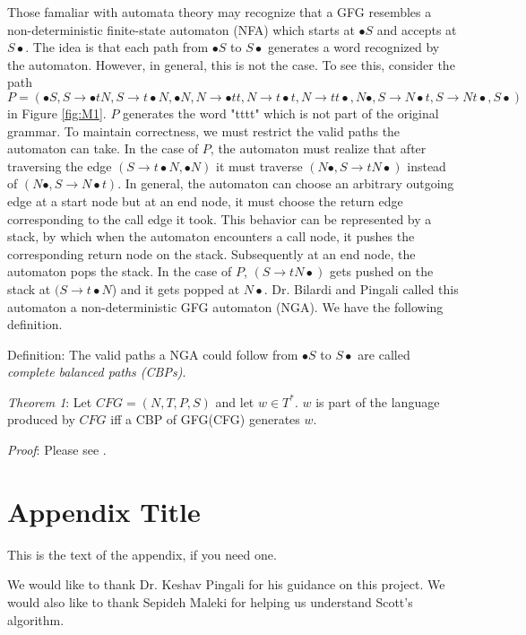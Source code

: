 \documentclass{sigplanconf}
\begin{document}
Those famaliar with automata theory may recognize that a GFG resembles a non-deterministic finite-state automaton (NFA) which starts at $\bullet{S}$ and accepts at $S\bullet$. The idea is that each path from $\bullet{S}$ to $S\bullet$ generates a word recognized by the automaton. However, in general, this is not the case. To see this, consider the path $P = (\bullet{S}, S\longrightarrow{\bullet{tN}}, S\longrightarrow{t\bullet{N}}, \bullet{N}, N\longrightarrow{\bullet{tt}}, N\longrightarrow{t\bullet{t}}, N\longrightarrow{tt\bullet}, N\bullet, S\longrightarrow{N\bullet{t}}, S\longrightarrow{Nt\bullet}, S\bullet)$ in Figure \ref{fig:M1}. $P$ generates the word "tttt" which is not part of the original grammar. To maintain correctness, we must restrict the valid paths the automaton can take. In the case of $P$, the automaton must realize that after traversing the edge $(S\longrightarrow{t\bullet{N}}, \bullet{N})$ it must traverse $(N\bullet, S\longrightarrow{tN\bullet})$ instead of $(N\bullet, S\longrightarrow{N\bullet{t}})$. In general, the automaton can choose an arbitrary outgoing edge at a start node but at an end node, it must choose the return edge corresponding to the call edge it took. This behavior can be represented by a stack, by which when the automaton encounters a call node, it pushes the corresponding return node on the stack. Subsequently at an end node, the automaton pops the stack. In the case of $P$, $(S\longrightarrow{tN\bullet})$ gets pushed on the stack at $(S\longrightarrow{t\bullet{N}}$) and it gets popped at $N\bullet$. Dr. Bilardi and Pingali called this automaton a non-deterministic GFG automaton (NGA). We have the following definition.

Definition: The valid paths a NGA could follow from $\bullet{S}$ to $S\bullet$ are called \textit{complete balanced paths (CBPs)}.

\textit{Theorem 1}: Let $CFG = (N, T, P, S)$ and let $w\in{T^*}$. $w$ is part of the language produced by $CFG$ iff a CBP of GFG(CFG) generates $w$.

\textit{Proof}: Please see \cite{bilardi-pingali}.
\appendix
\section{Appendix Title}

This is the text of the appendix, if you need one.

\acks
We would like to thank Dr. Keshav Pingali for his guidance on this project. We would also like to thank Sepideh Maleki for helping us understand Scott's algorithm.
\end{document}
